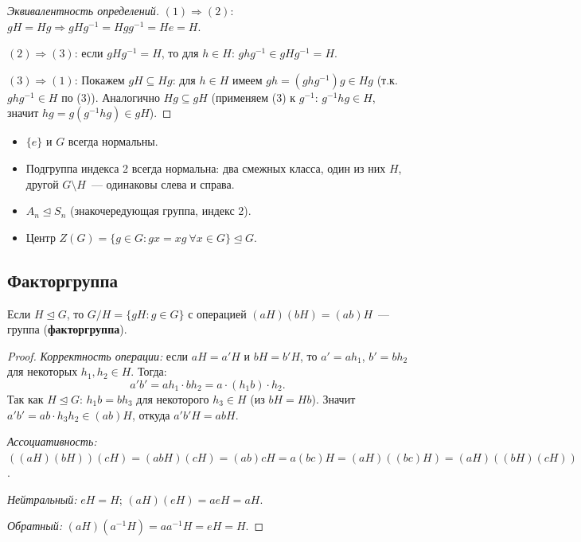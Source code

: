 \documentclass[12pt]{article}
\begin{document}
	\begin{proof}[Эквивалентность определений]
		$(1) \Rightarrow (2)$: $gH = Hg \Rightarrow gHg^{-1} = Hgg^{-1} = He = H$.
		
		$(2) \Rightarrow (3)$: если $gHg^{-1} = H$, то для $h \in H$: $ghg^{-1} \in gHg^{-1} = H$.
		
		$(3) \Rightarrow (1)$: Покажем $gH \subseteq Hg$: для $h \in H$ имеем $gh = (ghg^{-1})g \in Hg$ (т.к. $ghg^{-1} \in H$ по (3)). Аналогично $Hg \subseteq gH$ (применяем (3) к $g^{-1}$: $g^{-1}h g \in H$, значит $hg = g(g^{-1}hg) \in gH$).
	\end{proof}
	
	\begin{example}
		\begin{itemize}
			\item $\{e\}$ и $G$ всегда нормальны.
			\item Подгруппа индекса 2 всегда нормальна: два смежных класса, один из них $H$, другой $G \setminus H$~--- одинаковы слева и справа.
			\item $A_n \trianglelefteq S_n$ (знакочередующая группа, индекс 2).
			\item Центр $Z(G) = \{g \in G : gx = xg \ \forall x \in G\} \trianglelefteq G$.
		\end{itemize}
	\end{example}
	
	\subsection{Факторгруппа}
	
	\begin{theorem}
		Если $H \trianglelefteq G$, то $G/H = \{gH : g \in G\}$ с операцией $(aH)(bH) = (ab)H$~--- группа (\textbf{факторгруппа}).
	\end{theorem}
	
	\begin{proof}
		\textit{Корректность операции:} если $aH = a'H$ и $bH = b'H$, то $a' = ah_1$, $b' = bh_2$ для некоторых $h_1, h_2 \in H$. Тогда:
		\[a'b' = ah_1 \cdot bh_2 = a \cdot (h_1 b) \cdot h_2.\]
		Так как $H \trianglelefteq G$: $h_1 b = b h_3$ для некоторого $h_3 \in H$ (из $bH = Hb$). Значит $a'b' = ab \cdot h_3 h_2 \in (ab)H$, откуда $a'b'H = abH$.
		
		\textit{Ассоциативность:} $((aH)(bH))(cH) = (abH)(cH) = (ab)cH = a(bc)H = (aH)((bc)H) = (aH)((bH)(cH))$.
		
		\textit{Нейтральный:} $eH = H$; $(aH)(eH) = aeH = aH$.
		
		\textit{Обратный:} $(aH)(a^{-1}H) = aa^{-1}H = eH = H$.
	\end{proof}
	
\end{document}
